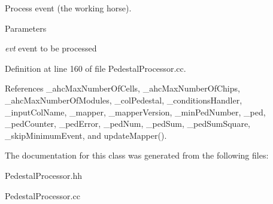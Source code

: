 Process event (the working horse). 
\begin{DoxyParams}{Parameters}
\item[{\em evt}]event to be processed \end{DoxyParams}


Definition at line 160 of file PedestalProcessor.cc.

References \_\-ahcMaxNumberOfCells, \_\-ahcMaxNumberOfChips, \_\-ahcMaxNumberOfModules, \_\-colPedestal, \_\-conditionsHandler, \_\-inputColName, \_\-mapper, \_\-mapperVersion, \_\-minPedNumber, \_\-ped, \_\-pedCounter, \_\-pedError, \_\-pedNum, \_\-pedSum, \_\-pedSumSquare, \_\-skipMinimumEvent, and updateMapper().

The documentation for this class was generated from the following files:\begin{DoxyCompactItemize}
\item 
PedestalProcessor.hh\item 
PedestalProcessor.cc\end{DoxyCompactItemize}
